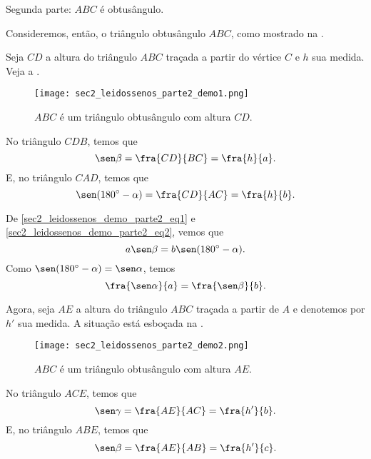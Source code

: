 Segunda parte: $ABC$ é obtusângulo.

Consideremos, então, o triângulo obtusângulo $ABC$, como mostrado na .

Seja $CD$ a altura do triângulo $ABC$ traçada a partir do vértice $C$ e $h$ sua medida. Veja a .
\begin{figure}[H]
    \centering
    \texttt{[image: sec2\_leidossenos\_parte2\_demo1.png]}
    \caption{$ABC$ é um triângulo obtusângulo com altura $CD$.}
    \label{sec2_leidossenos_parte2_demo1_fig}
\end{figure}

No triângulo $CDB$, temos que 
\begin{equation}
\sen\beta=\fra{CD}{BC}=\fra{h}{a}.    \label{sec2_leidossenos_demo_parte2_eq1}
\end{equation}
E, no triângulo $CAD$, temos que
\begin{equation}
\sen(180^\circ-\alpha)=\fra{CD}{AC}=\fra{h}{b}.    \label{sec2_leidossenos_demo_parte2_eq2}
\end{equation}

De \eqref{sec2_leidossenos_demo_parte2_eq1} e \eqref{sec2_leidossenos_demo_parte2_eq2}, vemos que
$$a \sen\beta = b \sen(180^\circ-\alpha).$$
Como $\sen(180^\circ-\alpha)=\sen\alpha$, temos
\begin{equation}
\fra{\sen\alpha}{a}=\fra{\sen\beta}{b}.    \label{sec2_leidossenos_demo_parte2_eq3}
\end{equation}

Agora, seja $AE$ a altura do triângulo $ABC$ traçada a partir de $A$ e denotemos por $h'$ sua medida. A situação está esboçada na .
\begin{figure}[H]
    \centering
    \texttt{[image: sec2\_leidossenos\_parte2\_demo2.png]}
    \caption{$ABC$ é um triângulo obtusângulo com altura $AE$.}
    \label{sec2_leidossenos_parte2_demo2_fig}
\end{figure}

No triângulo $ACE$, temos que 
\begin{equation}
\sen\gamma=\fra{AE}{AC}=\fra{h'}{b}.    \label{sec2_leidossenos_demo_parte2_eq4}
\end{equation}
E, no triângulo $ABE$, temos que
\begin{equation}
\sen\beta=\fra{AE}{AB}=\fra{h'}{c}.    \label{sec2_leidossenos_demo_parte2_eq5}
\end{equation}

